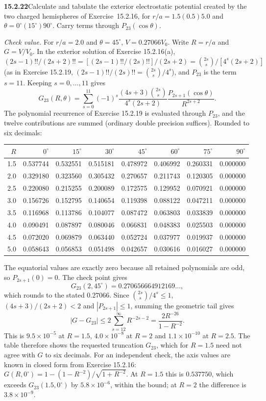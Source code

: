 \par\bigskip
\noindent\textbf{15.2.22}\quad Calculate and tabulate the exterior
electrostatic potential created by the two charged hemispheres of
Exercise~15.2.16, for $r/a=1.5(0.5)5.0$ and
$\theta=0^{\circ}(15^{\circ})90^{\circ}$. Carry terms through
$P_{23}(\cos\theta)$.
\par\nobreak\hfill\emph{Check value.}\enspace
For $r/a=2.0$ and $\theta=45^{\circ}$, $V=0.27066V_{0}$.
\solution
Write $R=r/a$ and $G=V/V_0$. In the exterior solution of
Exercise 15.2.16(a),
$(2s-1)!!/(2s+2)!!=[(2s-1)!!/(2s)!!]/(2s+2)=\binom{2s}{s}/[4^s(2s+2)]$
(as in Exercise 15.2.19, $(2s-1)!!/(2s)!!=\binom{2s}{s}/4^s$),
and $P_{23}$ is the term $s=11$. Keeping $s=0,\ldots,11$ gives
\[
G_{23}(R,\theta)=\sum_{s=0}^{11}
(-1)^s\frac{(4s+3)\binom{2s}{s}}{4^s(2s+2)}
\frac{P_{2s+1}(\cos\theta)}{R^{2s+2}}.
\]
The polynomial recurrence of Exercise 15.2.19 is evaluated through
$P_{23}$, and the twelve contributions are summed (ordinary double
precision suffices). Rounded to six decimals:
\begin{center}\small
\setlength{\tabcolsep}{4pt}
\begin{tabular}{r|rrrrrrr}\toprule
$R$&$0^\circ$&$15^\circ$&$30^\circ$&$45^\circ$&$60^\circ$&$75^\circ$&$90^\circ$\\\midrule
1.5&0.537744&0.532551&0.515181&0.478972&0.406992&0.260331&0.000000\\
2.0&0.329180&0.323560&0.305432&0.270657&0.211743&0.120305&0.000000\\
2.5&0.220080&0.215255&0.200089&0.172575&0.129952&0.070921&0.000000\\
3.0&0.156726&0.152795&0.140654&0.119398&0.088122&0.047211&0.000000\\
3.5&0.116968&0.113786&0.104077&0.087472&0.063803&0.033839&0.000000\\
4.0&0.090491&0.087897&0.080046&0.066831&0.048383&0.025503&0.000000\\
4.5&0.072020&0.069879&0.063440&0.052724&0.037977&0.019937&0.000000\\
5.0&0.058643&0.056853&0.051498&0.042657&0.030616&0.016027&0.000000\\
\bottomrule\end{tabular}\end{center}
The equatorial values are exactly zero because all retained polynomials
are odd, so $P_{2s+1}(0)=0$. The check point gives
\[
G_{23}(2,45^\circ)=0.270656664912169\ldots,
\]
which rounds to the stated $0.27066$.
Since $\binom{2s}{s}/4^s\le1$, $(4s+3)/(2s+2)<2$ and
$|P_{2s+1}|\le1$, summing the geometric tail gives
\[
|G-G_{23}|\le2\sum_{s=12}^\infty R^{-2s-2}
=\frac{2R^{-26}}{1-R^{-2}}.
\]
This is $9.5\times10^{-5}$ at $R=1.5$, $4.0\times10^{-8}$ at $R=2$ and
$1.1\times10^{-10}$ at $R=2.5$. The table therefore shows the requested
truncation $G_{23}$, which for $R=1.5$ need not agree with $G$ to six
decimals.
For an independent check, the axis values are known in closed form from
Exercise 15.2.16: $G(R,0^\circ)=1-(1-R^{-2})/\sqrt{1+R^{-2}}$.
At $R=1.5$ this is $0.537750$, which exceeds $G_{23}(1.5,0^\circ)$ by
$5.8\times10^{-6}$, within the bound; at $R=2$ the difference is
$3.8\times10^{-9}$.


